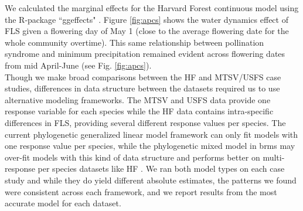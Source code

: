 \documentclass[11pt]{article}\usepackage[]{graphicx}\usepackage[]{color}
\begin{document}
{%
%
%


\indent We calculated the marginal effects for the Harvard Forest continuous model using the R-package ``ggeffects" \citep{Ludecke2018}. Figure \ref{fig:apcs} shows the water dynamics effect of FLS given a flowering day of May 1 (close to the average flowering date for the whole community overtime). This same relationship between pollination syndrome and minimum precipitation remained evident across flowering dates from mid April-June (see Fig. \ref{fig:apcs}). \\

\noindent Though we make broad comparisons between the HF and MTSV/USFS case studies, differences in data structure between the datasets required us to use alternative modeling frameworks. The MTSV and USFS data provide one response variable for each species while the HF data contains intra-specific differences in FLS, providing several different response values per species. The current phylogenetic generalized linear model framework can only fit models with one response value per species, while the phylogenetic mixed model in brms may over-fit models with this kind of data structure and performs better on multi-response per species datasets like HF \citep{BurknerPC}. We ran both model types on each case study and while they do yield different absolute estimates, the patterns we found were consistent across each framework, and we report results from the most accurate model for each dataset.\\

}
\end{document}
